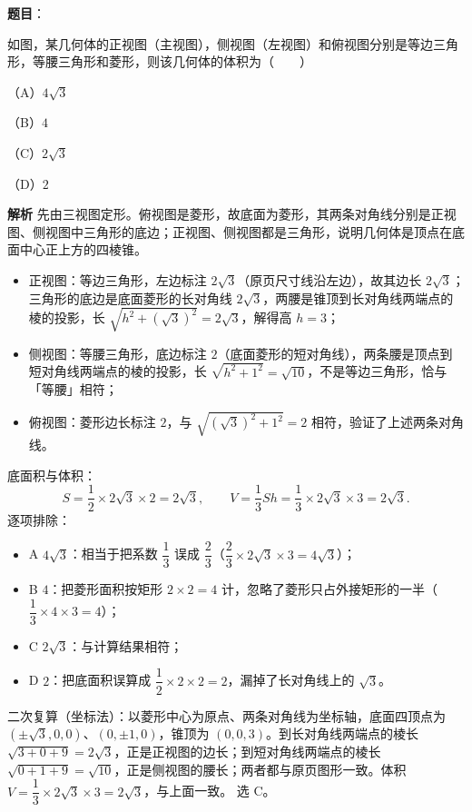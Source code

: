 \begin{answer}

\textbf{题目}：

如图，某几何体的正视图（主视图），侧视图（左视图）和俯视图分别是等边三角形，等腰三角形和菱形，则该几何体的体积为\mbox{（　　）}

（A）$4\sqrt3$

（B）$4$

（C）$2\sqrt3$

（D）$2$
\nopagebreak[4]
\begin{center}\end{center}
\nopagebreak[4]
\textbf{解析}
先由三视图定形。俯视图是菱形，故底面为菱形，其两条对角线分别是正视图、侧视图中三角形的底边；正视图、侧视图都是三角形，说明几何体是顶点在底面中心正上方的四棱锥。
\begin{itemize}
\item 正视图：等边三角形，左边标注 $2\sqrt3$（原页尺寸线沿左边），故其边长 $2\sqrt3$；三角形的底边是底面菱形的长对角线 $2\sqrt3$，两腰是锥顶到长对角线两端点的棱的投影，长 $\sqrt{h^2+\left(\sqrt3\right)^2}=2\sqrt3$，解得高 $h=3$；
\item 侧视图：等腰三角形，底边标注 $2$（底面菱形的短对角线），两条腰是顶点到短对角线两端点的棱的投影，长 $\sqrt{h^2+1^2}=\sqrt{10}$，不是等边三角形，恰与「等腰」相符；
\item 俯视图：菱形边长标注 $2$，与 $\sqrt{\left(\sqrt3\right)^2+1^2}=2$ 相符，验证了上述两条对角线。
\end{itemize}

底面积与体积：
\nopagebreak[4]
\[
S=\frac12\times2\sqrt3\times2=2\sqrt3,\qquad
V=\frac13Sh=\frac13\times2\sqrt3\times3=2\sqrt3.
\]
逐项排除：
\begin{itemize}
\item A $4\sqrt3$：相当于把系数 $\dfrac13$ 误成 $\dfrac23$（$\dfrac23\times2\sqrt3\times3=4\sqrt3$）；
\item B $4$：把菱形面积按矩形 $2\times2=4$ 计，忽略了菱形只占外接矩形的一半（$\dfrac13\times4\times3=4$）；
\item C $2\sqrt3$：与计算结果相符；
\item D $2$：把底面积误算成 $\dfrac12\times2\times2=2$，漏掉了长对角线上的 $\sqrt3$。
\end{itemize}
二次复算（坐标法）：以菱形中心为原点、两条对角线为坐标轴，底面四顶点为 $(\pm\sqrt3,0,0)$、$(0,\pm1,0)$，锥顶为 $(0,0,3)$。到长对角线两端点的棱长 $\sqrt{3+0+9}=2\sqrt3$，正是正视图的边长；到短对角线两端点的棱长 $\sqrt{0+1+9}=\sqrt{10}$，正是侧视图的腰长；两者都与原页图形一致。体积 $V=\dfrac13\times2\sqrt3\times3=2\sqrt3$，与上面一致。
选 C。


\end{answer}
